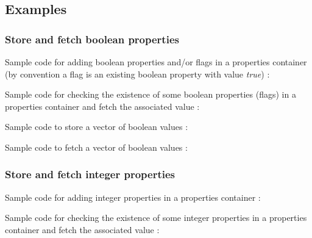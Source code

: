 
\subsection{Examples}

\subsubsection{Store and fetch boolean properties}

\pn  Sample code  for  adding  boolean properties  and/or  flags in  a
properties  container (by  convention a  flag is  an  existing boolean
property with value \emph{true}) :

\pn
{}

\pn Sample code for checking  the existence of some boolean properties
(flags) in a properties container and fetch the associated value :

\pn
{}

\pn Sample code to store a vector of boolean values :

\pn
{}

\pn Sample code to fetch a vector of boolean values :
\pn
{}


\subsubsection{Store and fetch integer properties}


\pn  Sample  code  for  adding  integer  properties  in  a  properties
container :

\pn
{}

\pn Sample code for checking  the existence of some integer properties
in a properties container and fetch the associated value :

